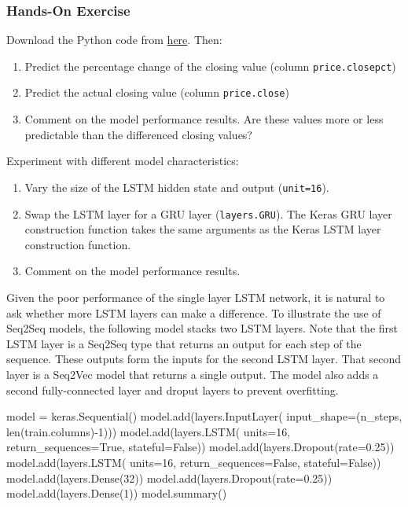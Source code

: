 \begin{tcolorbox}[colback=code]
\subsubsection*{Hands-On Exercise} 

Download the Python code from \href{https://raw.githubusercontent.com/jevermann/busi4720-ml/main/lstm_example.py}{here}. Then:

\begin{enumerate}
   \item Predict the percentage change of the closing value (column \texttt{price.closepct})
   \item Predict the actual closing value (column \texttt{price.close})
   \item Comment on the model performance results. Are these values more or less predictable than the differenced closing values?
\end{enumerate} \vspace{\baselineskip}

Experiment with different model characteristics:
\begin{enumerate}
    \item Vary the size of the LSTM hidden state and output (\texttt{unit=16}).
    \item Swap the LSTM layer for a GRU layer (\texttt{layers.GRU}). The Keras GRU layer construction function takes the same arguments as the Keras LSTM layer construction function.
    \item Comment on the model performance results.
\end{enumerate}
\end{tcolorbox}

Given the poor performance of the single layer LSTM network, it is natural to ask whether more LSTM layers can make a difference. To illustrate the use of Seq2Seq models, the following model stacks two LSTM layers. Note that the first LSTM layer is a Seq2Seq type that returns an output for each step of the sequence. These outputs form the inputs for the second LSTM layer. That second layer is a Seq2Vec model that returns a single output. The model also adds a second fully-connected layer and droput layers to prevent overfitting. 

\begin{samepage}
\begin{pythoncode}
model = keras.Sequential()
model.add(layers.InputLayer(
    input_shape=(n_steps, len(train.columns)-1)))
model.add(layers.LSTM(
    units=16, return_sequences=True, stateful=False))
model.add(layers.Dropout(rate=0.25))
model.add(layers.LSTM(
    units=16, return_sequences=False, stateful=False))
model.add(layers.Dense(32))
model.add(layers.Dropout(rate=0.25))
model.add(layers.Dense(1))
model.summary()
\end{pythoncode}
\end{samepage}

